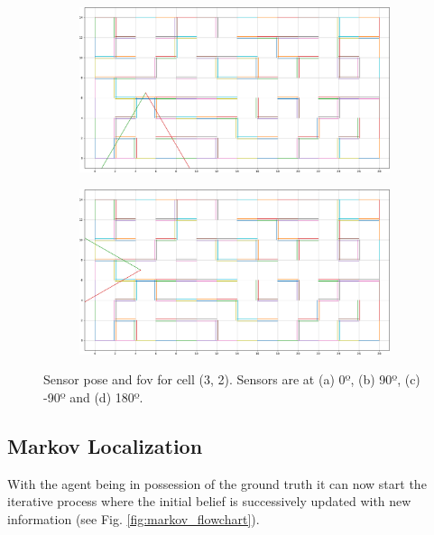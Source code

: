 \documentclass[runningheads]{llncs}
\begin{document}
\begin{figure}
	\begin{subfigure}[b]{0.49\textwidth}
		\centering
		\includegraphics[width=\textwidth]{imgs/agent_map_sensor2.png}
		\caption{}
	\end{subfigure}
	\begin{subfigure}[b]{0.49\textwidth}
		\centering
		\includegraphics[width=\textwidth]{imgs/agent_map_sensor3.png}
		\caption{}
	\end{subfigure}
	\caption{Sensor pose and \gls{fov} for cell (3, 2). Sensors are at (a) 0º, (b) 90º, (c) -90º and (d) 180º.}
	\label{fig:walls_sensors_poses}
\end{figure}
\FloatBarrier

\subsection{Markov Localization}

With the agent being in possession of the ground truth it can now start the iterative process where the initial belief is successively updated with new information (see Fig. \ref{fig:markov_flowchart}). 
\end{document}
